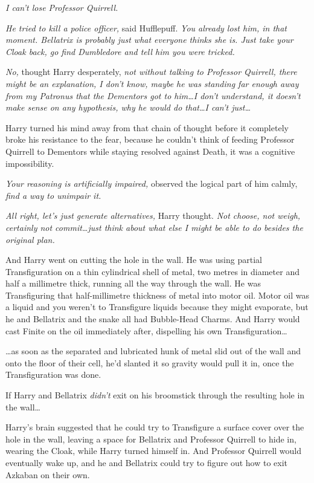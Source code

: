 \emph{I can’t lose Professor Quirrell.}

\emph{He tried to kill a police officer,} said Hufflepuff. \emph{You already lost him, in that moment. Bellatrix is probably just what everyone thinks she is. Just take your Cloak back, go find Dumbledore and tell him you were tricked.}

\emph{No,} thought Harry desperately, \emph{not without talking to Professor Quirrell, there might be an explanation, I don’t know, maybe he was standing far enough away from my Patronus that the Dementors got to him…I don’t understand, it doesn’t make sense on any hypothesis, why he would do that…I can’t just…}

Harry turned his mind away from that chain of thought before it completely broke his resistance to the fear, because he couldn’t think of feeding Professor Quirrell to Dementors while staying resolved against Death, it was a cognitive impossibility.

\emph{Your reasoning is artificially impaired,} observed the logical part of him calmly, \emph{find a way to unimpair it.}

\emph{All right, let’s just generate alternatives,} Harry thought. \emph{Not choose, not weigh, certainly not commit…just think about what else I might be able to do besides the original plan.}

And Harry went on cutting the hole in the wall. He was using partial Transfiguration on a thin cylindrical shell of metal, two metres in diameter and half a millimetre thick, running all the way through the wall. He was Transfiguring that half-millimetre thickness of metal into motor oil. Motor oil was a liquid and you weren’t to Transfigure liquids because they might evaporate, but he and Bellatrix and the snake all had Bubble-Head Charms. And Harry would cast Finite on the oil immediately after, dispelling his own Transfiguration…

…as soon as the separated and lubricated hunk of metal slid out of the wall and onto the floor of their cell, he’d slanted it so gravity would pull it in, once the Transfiguration was done.

If Harry and Bellatrix \emph{didn’t} exit on his broomstick through the resulting hole in the wall…

Harry’s brain suggested that he could try to Transfigure a surface cover over the hole in the wall, leaving a space for Bellatrix and Professor Quirrell to hide in, wearing the Cloak, while Harry turned himself in. And Professor Quirrell would eventually wake up, and he and Bellatrix could try to figure out how to exit Azkaban on their own.


